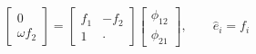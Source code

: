 \begin{equation}\label{eq:sys-Henry2015}
\left[\begin{array}{c}
	    0      \\
	\omega f_2
\end{array}\right]
=
\left[\begin{array}{cc}
	f_1 & -f_2  \\
	 1  & \cdot
\end{array}\right]
\left[\begin{array}{c}
	\phi_{12} \\
	\phi_{21}
\end{array}\right]
,\qquad
\hat{e}_i = f_i
\end{equation}
